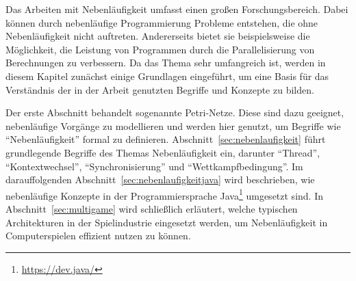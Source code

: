 Das Arbeiten mit Nebenläufigkeit umfasst einen großen Forschungsbereich. Dabei können durch nebenläufige Programmierung Probleme entstehen, die ohne Nebenläufigkeit nicht auftreten. Andererseits bietet sie beispielsweise die Möglichkeit, die Leistung von Programmen durch die Parallelisierung von Berechnungen zu verbessern. Da das Thema sehr umfangreich ist, werden in diesem Kapitel zunächst einige Grundlagen eingeführt, um eine Basis für das Verständnis der in der Arbeit genutzten Begriffe und Konzepte zu bilden. 

Der erste Abschnitt behandelt sogenannte Petri-Netze. Diese sind dazu geeignet, nebenläufige Vorgänge zu modellieren und werden hier genutzt, um Begriffe wie \enquote{Nebenläufigkeit} formal zu definieren. Abschnitt~\ref{sec:nebenlaufigkeit} führt grundlegende Begriffe des Themas Nebenläufigkeit ein, darunter \enquote{Thread}, \enquote{Kontextwechsel}, \enquote{Synchronisierung} und \enquote{Wettkampfbedingung}. Im darauffolgenden Abschnitt~\ref{sec:nebenlaufigkeitjava} wird beschrieben, wie nebenläufige Konzepte in der Programmiersprache Java\footnote{\url{https://dev.java/}} umgesetzt sind. In Abschnitt~\ref{sec:multigame} wird schließlich erläutert, welche typischen Architekturen in der Spielindustrie eingesetzt werden, um Nebenläufigkeit in Computerspielen effizient nutzen zu können.